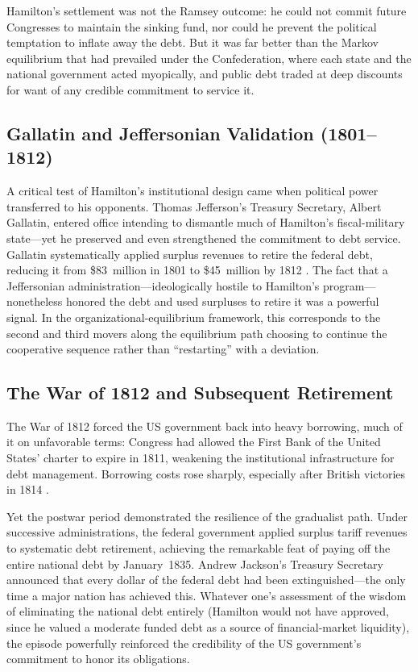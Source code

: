 \documentclass[12pt]{article}
\begin{document}
Hamilton's settlement was not the Ramsey outcome: he could not commit
future Congresses to maintain the sinking fund, nor could he prevent the
political temptation to inflate away the debt.  But it was far better than
the Markov equilibrium that had prevailed under the Confederation, where
each state and the national government acted myopically, and public debt
traded at deep discounts for want of any credible commitment to service
it.

\subsection{Gallatin and Jeffersonian Validation (1801--1812)}

A critical test of Hamilton's institutional design came when political power
transferred to his opponents.  Thomas Jefferson's Treasury Secretary,
Albert Gallatin, entered office intending to dismantle much of Hamilton's
fiscal-military state---yet he preserved and even strengthened the
commitment to debt service.  Gallatin systematically applied surplus
revenues to retire the federal debt, reducing it from \$83~million in 1801
to \$45~million by 1812 \citep{balack2012gallatin}.  The fact that a
Jeffersonian administration---ideologically hostile to Hamilton's
program---nonetheless honored the debt and used surpluses to retire it
was a powerful signal.  In the organizational-equilibrium framework, this
corresponds to the second and third movers along the equilibrium path
choosing to continue the cooperative sequence rather than ``restarting''
with a deviation.

\subsection{The War of 1812 and Subsequent Retirement}

The War of 1812 forced the US government back into heavy borrowing, much
of it on unfavorable terms: Congress had allowed the First Bank of the
United States' charter to expire in 1811, weakening the institutional
infrastructure for debt management.  Borrowing costs rose sharply,
especially after British victories in 1814 \citep{hallsargent2014}.

Yet the postwar period demonstrated the resilience of the gradualist
path.  Under successive administrations, the federal government applied
surplus tariff revenues to systematic debt retirement, achieving the
remarkable feat of paying off the entire national debt by January~1835.
Andrew Jackson's Treasury Secretary announced that every dollar of the
federal debt had been extinguished---the only time a major nation has
achieved this.  Whatever one's assessment of the wisdom of eliminating
the national debt entirely (Hamilton would not have approved, since he
valued a moderate funded debt as a source of financial-market liquidity),
the episode powerfully reinforced the credibility of the US government's
commitment to honor its obligations.
\end{document}

